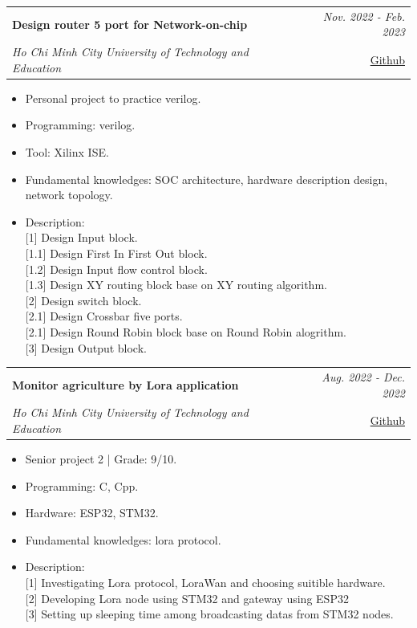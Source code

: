 \documentclass[a4paper,11pt]{article}
\makeatletter
\newcommand{\resumeProject}[4]{
\vspace{0.5mm}\item
    \begin{tabular*}{0.98\textwidth}[t]{l@{\extracolsep{\fill}}r}
        \textbf{#1} & \textit{\footnotesize{#3}} \\
        \footnotesize{\textit{#2}} & \footnotesize{#4}
    \end{tabular*}
    \vspace{-2.4mm}
}
\newcommand{\resumeItemListStart}{\begin{justify}\begin{itemize}[leftmargin=3ex, rightmargin=2ex, noitemsep,labelsep=1.2mm,itemsep=0mm]\small}
\newcommand{\resumeItemListEnd}{\end{itemize}\end{justify}\vspace{-2mm}}
\makeatother
\begin{document}
\resumeProject
    {Design router 5 port for Network-on-chip}
    {Ho Chi Minh City University of Technology and Education}
    {Nov. 2022 - Feb. 2023}{\href{https://github.com/Winxkin/Noc_prj}{Github}}
    \resumeItemListStart
    \item {Personal project to practice verilog.}
    \item {Programming: verilog.}
    \item {Tool: Xilinx ISE.}
    \item {Fundamental knowledges: SOC architecture, hardware description design, network topology.}
    \item {Description:}\hfill
    \\ {[1] Design Input block.}
    \\ {[1.1] Design First In First Out block.}
    \\ {[1.2] Design Input flow control block.}
    \\ {[1.3] Design XY routing block base on XY routing algorithm.}
    \\ {[2] Design switch block.}
    \\ {[2.1] Design Crossbar five ports.}
    \\ {[2.1] Design Round Robin block base on Round Robin alogrithm.}
    \\ {[3] Design Output block.}

\resumeItemListEnd

\resumeProject
      {Monitor agriculture by Lora application}%
      {Ho Chi Minh City University of Technology and Education}%
      {Aug. 2022 - Dec. 2022}
      {\href{https://github.com/Winxkin/monitor_agriculture}{Github}}
      \resumeItemListStart
        \item {Senior project 2 | Grade: 9/10.}
        \item {Programming: C, Cpp.}
        \item {Hardware: ESP32, STM32.}
        \item {Fundamental knowledges: lora protocol.}
        \item {Description:}\hfill
        \\ {[1] Investigating Lora protocol, LoraWan and choosing suitible hardware.}
        \\ {[2] Developing Lora node using STM32 and gateway using ESP32}
        \\ {[3] Setting up sleeping time among broadcasting datas from STM32 nodes.}
\resumeItemListEnd
\end{document}
